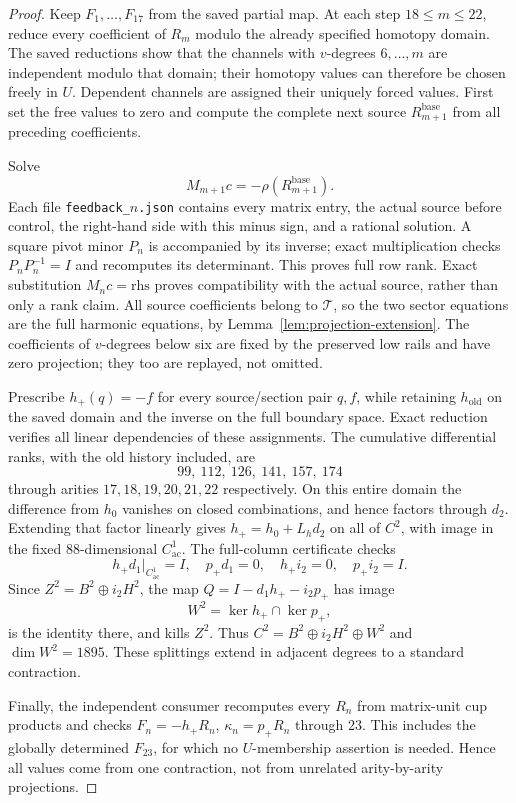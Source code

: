 \documentclass[11pt]{amsart}
\begin{document}
\begin{proof}
Keep $F_1,\ldots,F_{17}$ from the saved partial map. At each step $18\le m\le22$,
reduce every coefficient of $R_m$ modulo the already specified homotopy domain.
The saved reductions show that the channels with $v$-degrees $6,\ldots,m$
are independent modulo that domain; their homotopy values can therefore be
chosen freely in $U$. Dependent channels are assigned their uniquely forced
values. First set the free values to zero and compute the complete next source
$R_{m+1}^{\mathrm{base}}$ from all preceding coefficients.

Solve
\[
M_{m+1}c=-\rho(R_{m+1}^{\mathrm{base}}).
\]
Each file \texttt{feedback\_}$n$\texttt{.json} contains every matrix entry,
the actual source before control, the right-hand side with this minus sign,
and a rational solution. A square pivot minor $P_n$ is accompanied by its
inverse; exact multiplication checks $P_nP_n^{-1}=I$ and recomputes its
determinant. This proves full row rank. Exact substitution $M_nc=\mathrm{rhs}$
proves compatibility with the actual source, rather than only a rank claim.
All source coefficients belong to $\mathcal T$, so the two sector equations
are the full harmonic equations, by Lemma~\ref{lem:projection-extension}.
The coefficients of $v$-degrees below six are fixed by the preserved low rails
and have zero projection; they too are replayed, not omitted.

Prescribe $h_+(q)=-f$ for every source/section pair $q,f$, while retaining
$h_{\mathrm{old}}$ on the saved domain and the inverse on the full boundary
space. Exact reduction verifies all linear dependencies of these assignments.
The cumulative differential ranks, with the old history included, are
\[
99,\ 112,\ 126,\ 141,\ 157,\ 174
\]
through arities $17,18,19,20,21,22$ respectively.
On this entire domain the difference from $h_0$ vanishes on closed
combinations, and hence factors through $d_2$. Extending that factor linearly
gives $h_+=h_0+L_hd_2$ on all of $C^2$, with image in the fixed
$88$-dimensional $C^1_{\mathrm{ac}}$.
The full-column certificate checks
\[
h_+d_1|_{C^1_{\mathrm{ac}}}=I,\quad p_+d_1=0,\quad
h_+i_2=0,\quad p_+i_2=I.
\]
Since $Z^2=B^2\oplus i_2H^2$, the map
$Q=I-d_1h_+-i_2p_+$ has image
\[
W^2=\ker h_+\cap\ker p_+,
\]
is the identity there, and kills $Z^2$. Thus
$C^2=B^2\oplus i_2H^2\oplus W^2$ and $\dim W^2=1895$.
These splittings extend in adjacent degrees to a standard contraction.

Finally, the independent consumer recomputes every $R_n$ from matrix-unit
cup products and checks $F_n=-h_+R_n$, $\kappa_n=p_+R_n$ through $23$.
This includes the globally determined $F_{23}$, for which no $U$-membership
assertion is needed. Hence all values come from one contraction, not from
unrelated arity-by-arity projections.
\end{proof}
\end{document}
